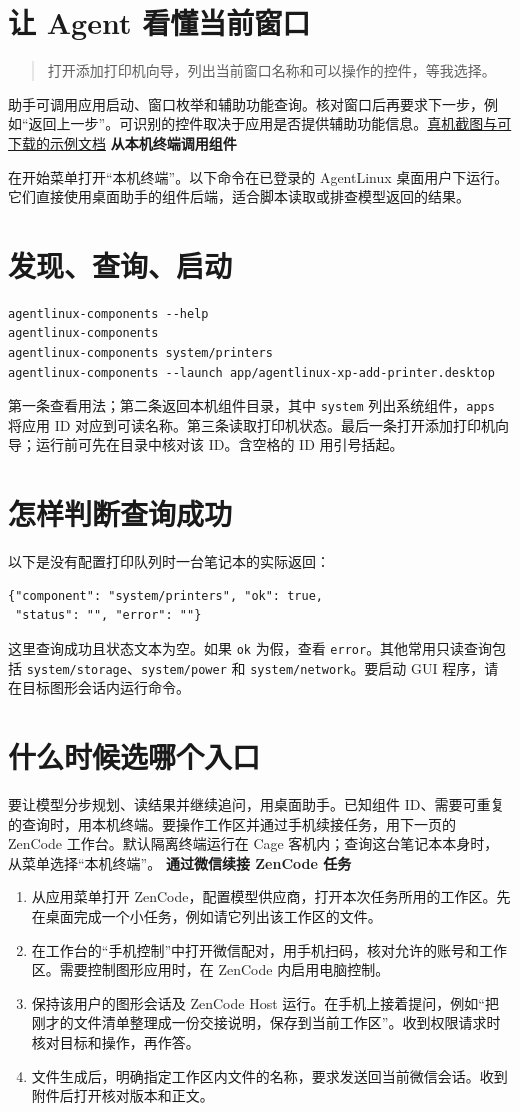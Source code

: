 \documentclass[11pt,a4paper]{article}
\newcommand{\chaptertitle}[1]{{\Large\sffamily\bfseries\color{blueink}#1}\par}
\newcommand{\sample}[1]{\begin{quote}\sffamily #1\end{quote}}
\begin{document}
\section*{让 Agent 看懂当前窗口}
\sample{打开添加打印机向导，列出当前窗口名称和可以操作的控件，等我选择。}
助手可调用应用启动、窗口枚举和辅助功能查询。核对窗口后再要求下一步，例如“返回上一步”。可识别的控件取决于应用是否提供辅助功能信息。\href{https://bennix.github.io/AgentLinux/\#hardware-demo}{真机截图与可下载的示例文档}
\newpage
\chaptertitle{从本机终端调用组件}
在开始菜单打开“本机终端”。以下命令在已登录的 AgentLinux 桌面用户下运行。它们直接使用桌面助手的组件后端，适合脚本读取或排查模型返回的结果。
\section*{发现、查询、启动}
\begin{verbatim}
agentlinux-components --help
agentlinux-components
agentlinux-components system/printers
agentlinux-components --launch app/agentlinux-xp-add-printer.desktop
\end{verbatim}
第一条查看用法；第二条返回本机组件目录，其中 \texttt{system} 列出系统组件，\texttt{apps} 将应用 ID 对应到可读名称。第三条读取打印机状态。最后一条打开添加打印机向导；运行前可先在目录中核对该 ID。含空格的 ID 用引号括起。
\section*{怎样判断查询成功}
以下是没有配置打印队列时一台笔记本的实际返回：
\begin{verbatim}
{"component": "system/printers", "ok": true,
 "status": "", "error": ""}
\end{verbatim}
这里查询成功且状态文本为空。如果 \texttt{ok} 为假，查看 \texttt{error}。其他常用只读查询包括 \texttt{system/storage}、\texttt{system/power} 和 \texttt{system/network}。要启动 GUI 程序，请在目标图形会话内运行命令。
\section*{什么时候选哪个入口}
要让模型分步规划、读结果并继续追问，用桌面助手。已知组件 ID、需要可重复的查询时，用本机终端。要操作工作区并通过手机续接任务，用下一页的 ZenCode 工作台。默认隔离终端运行在 Cage 客机内；查询这台笔记本本身时，从菜单选择“本机终端”。
\newpage
\chaptertitle{通过微信续接 ZenCode 任务}
\begin{enumerate}
\item 从应用菜单打开 ZenCode，配置模型供应商，打开本次任务所用的工作区。先在桌面完成一个小任务，例如请它列出该工作区的文件。
\item 在工作台的“手机控制”中打开微信配对，用手机扫码，核对允许的账号和工作区。需要控制图形应用时，在 ZenCode 内启用电脑控制。
\item 保持该用户的图形会话及 ZenCode Host 运行。在手机上接着提问，例如“把刚才的文件清单整理成一份交接说明，保存到当前工作区”。收到权限请求时核对目标和操作，再作答。
\item 文件生成后，明确指定工作区内文件的名称，要求发送回当前微信会话。收到附件后打开核对版本和正文。
\end{enumerate}
\end{document}
